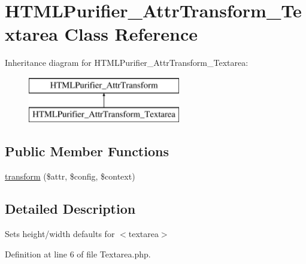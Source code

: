 \hypertarget{classHTMLPurifier__AttrTransform__Textarea}{\section{H\+T\+M\+L\+Purifier\+\_\+\+Attr\+Transform\+\_\+\+Textarea Class Reference}
\label{classHTMLPurifier__AttrTransform__Textarea}
}
Inheritance diagram for H\+T\+M\+L\+Purifier\+\_\+\+Attr\+Transform\+\_\+\+Textarea\+:\begin{figure}[H]
\begin{center}
\leavevmode
\includegraphics[height=2.000000cm]{classHTMLPurifier__AttrTransform__Textarea}
\end{center}
\end{figure}
\subsection*{Public Member Functions}
\begin{DoxyCompactItemize}
\item 
\hyperlink{classHTMLPurifier__AttrTransform__Textarea_a1120eb4321b560918c63450793449b52}{transform} (\$attr, \$config, \$context)
\end{DoxyCompactItemize}


\subsection{Detailed Description}
Sets height/width defaults for $<$textarea$>$ 

Definition at line 6 of file Textarea.\+php.



